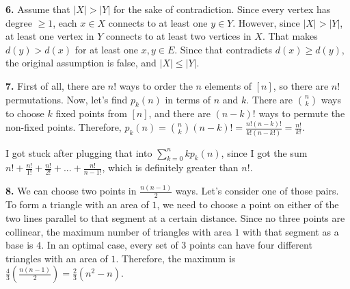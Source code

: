 \documentclass{article}
\begin{document}
\textbf{6.} Assume that $|X| > |Y|$ for the sake of contradiction. Since every vertex has degree $\ge 1$, each $x \in X$ connects to at least one $y \in Y$. However, since $|X| > |Y|$, at least one vertex in $Y$ connects to at least two vertices in $X$. That makes $d(y) > d(x)$ for at least one ${x, y} \in E$. Since that contradicts $d(x) \ge d(y)$, the original assumption is false, and $|X| \le |Y|$.
\newline

\textbf{7.} First of all, there are $n!$ ways to order the $n$ elements of $[n]$, so there are $n!$ permutations. Now, let's find $p_k(n)$ in terms of $n$ and $k$. There are $n\choose k$ ways to choose $k$ fixed points from $[n]$, and there are $(n - k)!$ ways to permute the non-fixed points. Therefore, $p_k(n) = $$n\choose k$$(n - k)! = \frac{n!(n - k)!}{k!(n - k!)} = \frac{n!}{k!}$.
\newline

I got stuck after plugging that into $\sum_{k = 0}^nkp_k(n)$, since I got the sum $n! + \frac{n!}{1!} + \frac{n!}{2!} + ... + \frac{n!}{n - 1!}$, which is definitely greater than $n!$.
\newline

\textbf{8.} We can choose two points in $\frac{n(n - 1)}{2}$ ways. Let's consider one of those pairs. To form a triangle with an area of $1$, we need to choose a point on either of the two lines parallel to that segment at a certain distance. Since no three points are collinear, the maximum number of triangles with area $1$ with that segment as a base is $4$. In an optimal case, every set of $3$ points can have four different triangles with an area of $1$. Therefore, the maximum is $\frac{4}{3}(\frac{n(n - 1)}{2}) = \frac{2}{3}(n^2 - n)$.
\end{document}
